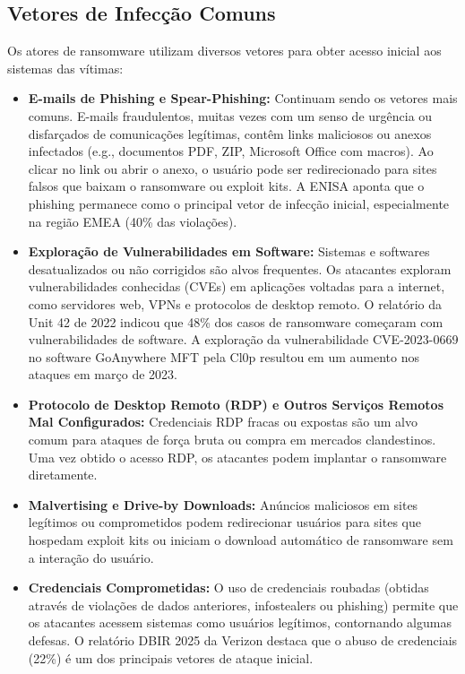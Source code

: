 \subsection{Vetores de Infecção Comuns}

Os atores de ransomware utilizam diversos vetores para obter acesso inicial aos sistemas das vítimas:

\begin{itemize}
    \item \textbf{E-mails de Phishing e Spear-Phishing:} Continuam sendo os vetores mais comuns. E-mails fraudulentos, muitas 
    vezes com um senso de urgência ou disfarçados de comunicações legítimas, contêm links maliciosos ou anexos infectados 
    (e.g., documentos PDF, ZIP, Microsoft Office com macros). Ao clicar no link ou abrir o anexo, o usuário pode ser redirecionado 
    para sites falsos que baixam o ransomware ou exploit kits. A ENISA aponta que o phishing permanece como o principal vetor de 
    infecção inicial, especialmente na região EMEA (40\% das violações).
    
    \item \textbf{Exploração de Vulnerabilidades em Software:} Sistemas e softwares desatualizados ou não corrigidos são alvos 
    frequentes. Os atacantes exploram vulnerabilidades conhecidas (CVEs) em aplicações voltadas para a internet, como servidores web, 
    VPNs e protocolos de desktop remoto. O relatório da Unit 42 de 2022 indicou que 48\% dos casos de ransomware começaram com 
    vulnerabilidades de software. A exploração da vulnerabilidade CVE-2023-0669 no software GoAnywhere MFT pela Cl0p resultou em um 
    aumento nos ataques em março de 2023.
    
    \item \textbf{Protocolo de Desktop Remoto (RDP) e Outros Serviços Remotos Mal Configurados:} Credenciais RDP fracas ou expostas 
    são um alvo comum para ataques de força bruta ou compra em mercados clandestinos. Uma vez obtido o acesso RDP, os atacantes podem 
    implantar o ransomware diretamente.
    
    \item \textbf{Malvertising e Drive-by Downloads:} Anúncios maliciosos em sites legítimos ou comprometidos podem redirecionar 
    usuários para sites que hospedam exploit kits ou iniciam o download automático de ransomware sem a interação do usuário.
    
    \item \textbf{Credenciais Comprometidas:} O uso de credenciais roubadas (obtidas através de violações de dados anteriores, 
    infostealers ou phishing) permite que os atacantes acessem sistemas como usuários legítimos, contornando algumas defesas. 
    O relatório DBIR 2025 da Verizon destaca que o abuso de credenciais (22\%) é um dos principais vetores de ataque inicial.
    

\end{itemize}
